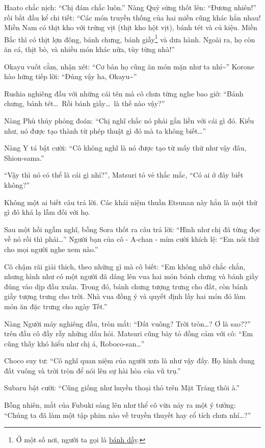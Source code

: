 \documentclass[../main.tex]{subfiles}
\begin{document}
Haato chắc nịch: ``Chị đám chắc luôn.'' Nàng Quỷ sừng thốt lên: ``Đương nhiên!'' rồi bắt đầu kể chi tiết: ``Các món truyền thống của hai miền cũng khác hẳn nhau! Miền Nam có thịt kho với trứng vịt (thịt kho hột vịt), bánh tét và củ kiệu. Miền Bắc thì có thịt lợn đông, bánh chưng, bánh giầy\footnote{Ở một số nơi, người ta gọi là \uline{bánh dầy}.} và dưa hành. Ngoài ra, họ còn ăn cá, thịt bò, và nhiều món khác nữa, tùy từng nhà!''

Okayu vuốt cằm, nhận xét: ``Cơ bản họ cũng ăn món mặn như ta nhỉ\~{}'' Korone hào hứng tiếp lời: ``Đúng vậy ha, Okayu\~{}''

Rushia nghiêng đầu với những cái tên mà cô chưa từng nghe bao giờ: ``Bánh chưng, bánh tét\dots\ Rồi bánh giầy\dots\ là thế nào vậy?''

Nàng Phù thủy phỏng đoán: ``Chị nghĩ chắc nó phải gắn liền với cái gì đó. Kiểu như, nó được tạo thành từ phép thuật gì đó mà ta không biết\dots''

Nàng Y tá bật cười: ``Cô không nghĩ là nó được tạo từ mấy thứ như vậy đâu, Shion-sama.''

``Vậy thì nó có thể là cái gì nhỉ?'', Matsuri tỏ vẻ thắc mắc, ``Có ai ở đây biết không?''

Không một ai biết câu trả lời. Các khái niệm thuần Etsunan này hẳn là một thứ gì đó khá lạ lẫm đối với họ.

Sau một hồi ngẫm nghĩ, bỗng Sora thốt ra câu trả lời: ``Hình như chị đã từng đọc về nó rồi thì phải\dots'' Người bạn của cô - A-chan - mỉm cười khích lệ: ``Em nói thử cho mọi người nghe xem nào.''

Cô chậm rãi giải thich, theo những gì mà cô biết: ``Em không nhớ chắc chắn, nhưng hình như có một người đã dâng lên vua hai món bánh chưng và bánh giầy đúng vào dịp đầu xuân. Trong đó, bánh chưng tượng trưng cho đất, còn bánh giầy tượng trưng cho trời. Nhà vua đồng ý và quyết định lấy hai món đó làm món ăn đặc trưng cho ngày Tết.''

Nàng Người máy nghiêng đầu, tròn mắt: ``Đất vuông? Trời tròn\dots? Ơ là sao??'' trên đầu cô đầy rẫy những dấu hỏi. Matsuri cũng bày tỏ đồng cảm với cô: ``Em cũng thấy khó hiểu như chị á, Roboco-san\dots''

Choco suy tư: ``Cô nghĩ quan niệm của người xưa là như vậy đấy. Họ hình dung đất vuông và trời tròn để nói lên sự hài hòa của vũ trụ.''

Subaru bật cười: ``Cũng giống như huyền thoại thỏ trên Mặt Trăng thôi à.''

Bỗng nhiên, mắt của Fubuki sáng lên như thể cô vừa nảy ra một ý tưởng: ``Chúng ta đã làm một tập phim nào về truyền thuyết hay cổ tích chưa nhỉ\dots?''
\end{document}
